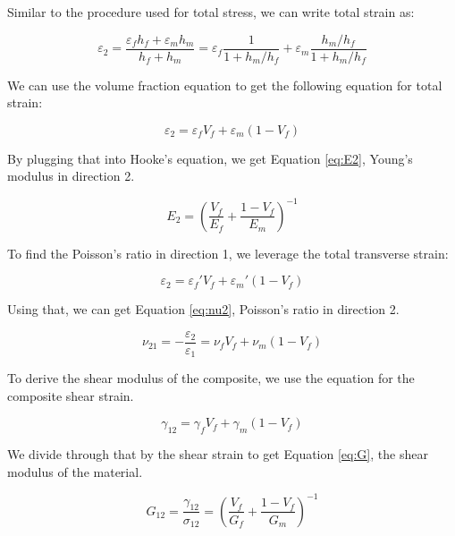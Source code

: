 Similar to the procedure used for total stress, we can write total strain as:

\begin{equation}
\varepsilon_2 = \frac{\varepsilon_f h_f + \varepsilon_m h_m}{h_f + h_m} = \varepsilon_f \frac{1}{1+h_m/h_f} + \varepsilon_m \frac{h_m/h_f}{1+h_m/h_f}
\end{equation}

We can use the volume fraction equation to get the following equation for total strain:

\begin{equation}
\varepsilon_2 = \varepsilon_f V_f + \varepsilon_m (1-V_f)
\end{equation}

By plugging that into Hooke's equation, we get Equation \ref{eq:E2}, Young's modulus in direction 2.

\begin{equation} \label{eq:E2}
E_2 = (\frac{V_f}{E_f} + \frac{1-V_f}{E_m})^{-1}
\end{equation}

To find the Poisson's ratio in direction 1, we leverage the total transverse strain:

\begin{equation}
\varepsilon_2 = \varepsilon_f' V_f + \varepsilon_m' (1-V_f)
\end{equation}

Using that, we can get Equation \ref{eq:nu2}, Poisson's ratio in direction 2.

\begin{equation} \label{eq:nu2}
\nu_{21} = -\frac{\varepsilon_2}{\varepsilon_1} = \nu_f V_f + \nu_m (1-V_f)
\end{equation}

To derive the shear modulus of the composite, we use the equation for the composite shear strain.

\begin{equation}
\gamma_{12} = \gamma_f V_f + \gamma_m (1-V_f)
\end{equation}

We divide through that by the shear strain to get Equation \ref{eq:G}, the shear modulus of the material.

\begin{equation} \label{eq:G}
G_{12} = \frac{\gamma_{12}}{\sigma_{12}} = (\frac{V_f}{G_f} + \frac{1-V_f}{G_m})^{-1}
\end{equation}

